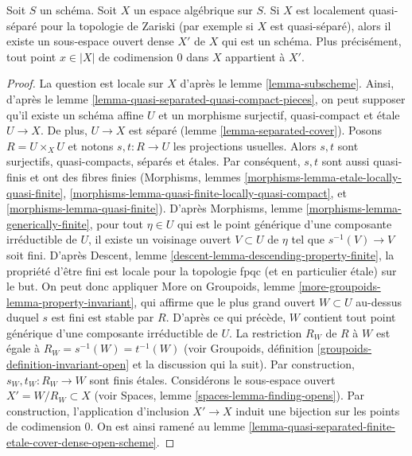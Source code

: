 \begin{proposition}
\label{proposition-locally-quasi-separated-open-dense-scheme}
Soit $S$ un schéma. Soit $X$ un espace algébrique sur $S$. Si $X$ est
localement quasi-séparé pour la topologie de Zariski (par exemple si $X$ est quasi-séparé), alors
il existe un sous-espace ouvert dense $X'$ de $X$ qui est un schéma.
Plus précisément, tout point $x \in |X|$ de codimension $0$ dans $X$
appartient à $X'$.
\end{proposition}

\begin{proof}
La question est locale sur $X$ d'après le lemme \ref{lemma-subscheme}.
Ainsi, d'après le lemme \ref{lemma-quasi-separated-quasi-compact-pieces},
on peut supposer qu'il existe un schéma affine $U$ et un morphisme
surjectif, quasi-compact et \'etale $U \to X$.
De plus, $U \to X$ est séparé (lemme \ref{lemma-separated-cover}).
Posons $R = U \times_X U$ et notons $s, t : R \to U$ les projections
usuelles. Alors $s, t$ sont surjectifs, quasi-compacts, séparés et
\'etales. Par conséquent, $s, t$ sont aussi quasi-finis et ont des fibres finies
(Morphisms,
lemmes \ref{morphisms-lemma-etale-locally-quasi-finite},
\ref{morphisms-lemma-quasi-finite-locally-quasi-compact}, et
\ref{morphisms-lemma-quasi-finite}).
D'après Morphisms, lemme \ref{morphisms-lemma-generically-finite},
pour tout $\eta \in U$ qui est le point générique d'une
composante irréductible de $U$, il existe un voisinage ouvert
$V \subset U$ de $\eta$ tel que $s^{-1}(V) \to V$ soit fini. D'après
Descent, lemme \ref{descent-lemma-descending-property-finite},
la propriété d'être fini est locale pour la topologie fpqc (et en particulier \'etale) sur le but.
On peut donc appliquer
More on Groupoids, lemme \ref{more-groupoids-lemma-property-invariant},
qui affirme que le plus grand ouvert $W \subset U$ au-dessus duquel $s$ est
fini est stable par $R$. D'après ce qui précède, $W$ contient tout
point générique d'une composante irréductible de $U$.
La restriction $R_W$ de $R$ à $W$ est égale à $R_W = s^{-1}(W) = t^{-1}(W)$
(voir Groupoids, définition \ref{groupoids-definition-invariant-open}
et la discussion qui la suit).
Par construction, $s_W, t_W : R_W \to W$ sont finis \'etales.
Considérons le sous-espace ouvert $X' = W/R_W \subset X$ (voir
Spaces, lemme \ref{spaces-lemma-finding-opens}).
Par construction, l'application d'inclusion $X' \to X$
induit une bijection sur les points de codimension $0$.
On est ainsi ramené au
lemme \ref{lemma-quasi-separated-finite-etale-cover-dense-open-scheme}.
\end{proof}




